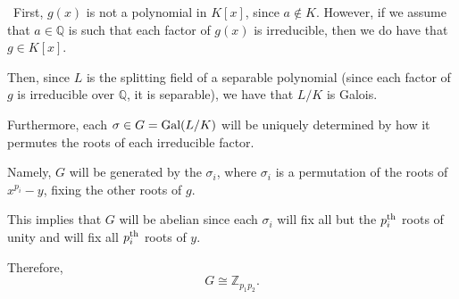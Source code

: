\documentclass[12pt]{AlgebraQual}
\begin{document}
\begin{solution}$\,$
First, $g(x)$ is not a polynomial in $K[x]$, since $a\not\in K$. However, if we assume that $a\in\mathbb{Q}$ is such that each factor of $g(x)$ is irreducible, then we do have that $g\in K[x]$.

Then, since $L$ is the splitting field of a separable polynomial (since each factor of $g$ is irreducible over $\mathbb{Q}$, it is separable), we have that $L/K$ is Galois.

 Furthermore, each $\sigma\in G=\text{Gal}(L/K)$ will be uniquely determined by how it permutes the roots of each irreducible factor.

Namely, $G$ will be generated by the $\sigma_i$, where $\sigma_i$ is a permutation of the roots of $x^{p_i}-y$, fixing the other roots of $g.$

This implies that $G$ will be abelian since each $\sigma_i$ will fix all but the $p_i^\text{th}$ roots of unity and will fix all $p_i^\text{th}$ roots of $y.$

Therefore, $$G\cong\mathbb{Z}_{p_1p_2}.$$
\end{solution}
\end{document}

